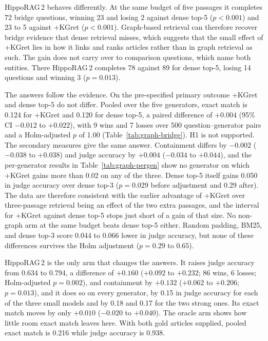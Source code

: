 \documentclass[preprint,12pt]{elsarticle}
\begin{document}
HippoRAG\,2 behaves differently. At the same budget of five passages it
completes 72 bridge questions, winning 23 and losing 2 against dense top-5
($p<0.001$) and 23 to 5 against +KGret ($p<0.001$). Graph-based retrieval can
therefore recover bridge evidence that dense retrieval misses, which suggests
that the small effect of +KGret lies in how it links and ranks articles rather
than in graph retrieval as such. The gain does not carry over to
comparison questions, which name both entities. There HippoRAG\,2 completes 78
against 89 for dense top-5, losing 14 questions and winning 3 ($p=0.013$).

The answers follow the evidence. On the pre-specified primary outcome +KGret
and dense top-5 do not differ. Pooled over the five generators, exact match is
0.124 for +KGret and 0.120 for dense top-5, a paired difference of $+0.004$
(95\% CI $-0.012$ to $+0.022$), with 9 wins and 7 losses over 500
question--generator pairs and a Holm-adjusted $p$ of 1.00
(Table~\ref{tab:graph-bridge}). H1 is not supported. The secondary measures
give the same answer. Containment differs by $-0.002$ ($-0.038$ to $+0.038$)
and judge accuracy by $+0.004$ ($-0.034$ to $+0.044$), and the per-generator
results in Table~\ref{tab:graph-pergen} show no generator on which +KGret
gains more than 0.02 on any of the three. Dense top-5 itself gains 0.050 in
judge accuracy over dense top-3 ($p=0.029$ before adjustment and 0.29 after).
The data are therefore consistent with the earlier advantage of +KGret over
three-passage retrieval being an effect of the two extra passages, and the
interval for +KGret against dense top-5 stops just short of a gain of that
size. No non-graph arm at
the same budget beats dense top-5 either. Random padding, BM25, and dense
top-3 score 0.044 to 0.066 lower in judge accuracy, but none of these
differences survives the Holm adjustment ($p=0.29$ to 0.65).

HippoRAG\,2 is the only arm that changes the answers. It raises judge accuracy
from 0.634 to 0.794, a difference of $+0.160$ ($+0.092$ to $+0.232$; 86 wins,
6 losses; Holm-adjusted $p=0.002$), and containment by $+0.132$ ($+0.062$ to
$+0.206$; $p=0.013$), and it does so on every generator, by 0.15 in judge
accuracy for each of the three small models and by 0.18 and 0.17 for the two
strong ones. Its exact match moves by only $+0.010$ ($-0.020$ to
$+0.040$). The oracle arm shows how little room exact match leaves here. With
both gold articles supplied, pooled exact match is 0.216 while judge accuracy
is 0.938.
\end{document}
